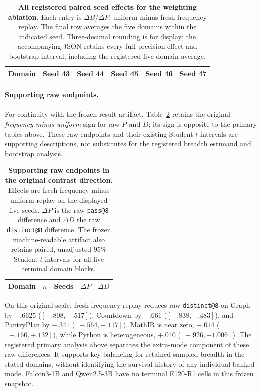 \documentclass{article}
\newcommand{\1}{\mathbf 1}
\theoremstyle{remark}
\theoremstyle{definition}
\theoremstyle{plain}
\begin{document}
\begin{table}[H]
  \centering
  \caption{\textbf{All registered paired seed effects for the weighting ablation.}
  Each entry is $\Delta B/\Delta P$, uniform minus fresh-frequency replay.
  The final row averages the five domains within the indicated seed.
  Three-decimal rounding is for display; the accompanying JSON retains
  every full-precision effect and bootstrap interval, including the registered
  five-domain average.}
  \label{tab:e120-primary-seeds}
  \scriptsize
  \setlength{\tabcolsep}{3pt}
  \begin{tabular}{@{}lrrrrr@{}}
    \toprule
    \textbf{Domain} & \textbf{Seed 43} & \textbf{Seed 44}
      & \textbf{Seed 45} & \textbf{Seed 46} & \textbf{Seed 47} \\
    \midrule
    
  \end{tabular}
\end{table}

\paragraph{Supporting raw endpoints.}
For continuity with the frozen result artifact,
Table~\ref{tab:e120-frequency-progress} retains the original
\emph{frequency-minus-uniform} sign for raw $P$ and $D$; its sign is opposite
to the primary tables above. These raw endpoints and their existing
Student-$t$ intervals are supporting descriptions, not substitutes for the
registered breadth estimand and bootstrap analysis.

\begin{table}[H]
  \centering
  \caption{\textbf{Supporting raw endpoints in the original contrast direction.}
  Effects are fresh-frequency minus uniform replay on the displayed five
  seeds. $\Delta P$ is the raw \texttt{pass@8} difference and $\Delta D$ the
  raw \texttt{distinct@8} difference. The frozen machine-readable artifact
  also retains paired, unadjusted 95\% Student-$t$ intervals for all five
  terminal domain blocks.}
  \label{tab:e120-frequency-progress}
  \small
  \begin{tabular}{@{}lrrrr@{}}
    \toprule
    \textbf{Domain} & $n$ & \textbf{Seeds} & $\Delta P$ & $\Delta D$ \\
    \midrule
    
  \end{tabular}
\end{table}

On this original scale, fresh-frequency replay reduces raw
\texttt{distinct@8} on Graph by $-.6625$ ($[-.808,-.517]$), Countdown by
$-.661$ ($[-.838,-.483]$), and PantryPlan by $-.341$ ($[-.564,-.117]$).
MathIR is near zero, $-.014$ ($[-.160,+.132]$), while Python is heterogeneous,
$+.040$ ($[-.926,+1.006]$). The registered primary analysis above separates
the extra-mode component of these raw differences. It supports key balancing
for retained sampled breadth in the stated domains, without identifying the
survival history of any individual banked mode. Falcon3-1B and Qwen2.5-3B
have no terminal E120-R1 cells in this frozen snapshot.
\end{document}
